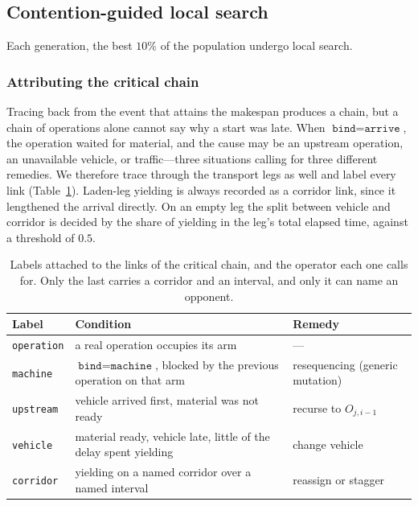 \documentclass[manuscript,screen,review]{acmart}
\begin{document}
\subsection{Contention-guided local search}
\label{sec:ls}

Each generation, the best $10\%$ of the population undergo local search.

\subsubsection{Attributing the critical chain}
Tracing back from the event that attains the makespan produces a chain, but a
chain of operations alone cannot say why a start was late. When
$\texttt{bind}=\texttt{arrive}$, the operation waited for material, and the
cause may be an upstream operation, an unavailable vehicle, or traffic---three
situations calling for three different remedies. We therefore trace through the
transport legs as well and label every link
(Table~\ref{tab:attrib}). Laden-leg yielding is always recorded as a corridor
link, since it lengthened the arrival directly. On an empty leg the split
between vehicle and corridor is decided by the share of yielding in the leg's
total elapsed time, against a threshold of $0.5$.

\begin{table}[t]
\caption{Labels attached to the links of the critical chain, and the operator
each one calls for. Only the last carries a corridor and an interval, and only
it can name an opponent.}
\label{tab:attrib}
\footnotesize
\begin{tabular}{@{}llp{2.55cm}@{}}
\toprule
Label & Condition & Remedy \\
\midrule
\texttt{operation} & a real operation occupies its arm & --- \\
\texttt{machine} & $\texttt{bind}=\texttt{machine}$, blocked by the previous
  operation on that arm & resequencing (generic mutation) \\
\texttt{upstream} & vehicle arrived first, material was not ready & recurse to
  $O_{j,i-1}$ \\
\texttt{vehicle} & material ready, vehicle late, little of the delay spent
  yielding & change vehicle \\
\texttt{corridor} & yielding on a named corridor over a named interval
  & reassign or stagger \\
\bottomrule
\end{tabular}
\end{table}
\end{document}
